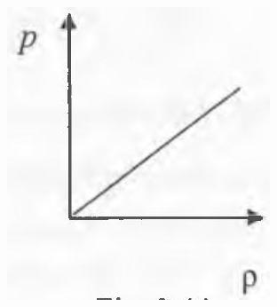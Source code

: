 \documentclass[10pt]{article}
\begin{document}
\includegraphics[max width=\textwidth, center]{2025_07_01_5b3ff9fa0d508c8e9f17g-139}
\end{document}
